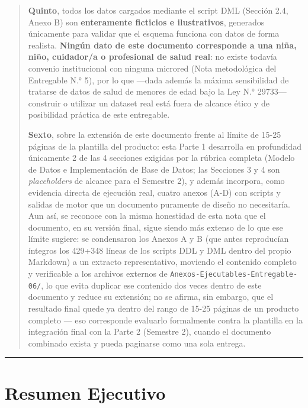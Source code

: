 \documentclass[11pt,a4paper]{article}
\begin{document}
\begin{quote}
\textbf{Quinto}, todos los datos cargados mediante el script DML (Sección 2.4, Anexo B) son \textbf{enteramente ficticios e ilustrativos}, generados únicamente para validar que el esquema funciona con datos de forma realista. \textbf{Ningún dato de este documento corresponde a una niña, niño, cuidador/a o profesional de salud real}: no existe todavía convenio institucional con ninguna microred (Nota metodológica del Entregable N.° 5), por lo que ---dada además la máxima sensibilidad de tratarse de datos de salud de menores de edad bajo la Ley N.° 29733--- construir o utilizar un dataset real está fuera de alcance ético y de posibilidad práctica de este entregable.

\textbf{Sexto}, sobre la extensión de este documento frente al límite de 15-25 páginas de la plantilla del producto: esta Parte 1 desarrolla en profundidad únicamente 2 de las 4 secciones exigidas por la rúbrica completa (Modelo de Datos e Implementación de Base de Datos; las Secciones 3 y 4 son \emph{placeholders} de alcance para el Semestre 2), y además incorpora, como evidencia directa de ejecución real, cuatro anexos (A-D) con scripts y salidas de motor que un documento puramente de diseño no necesitaría. Aun así, se reconoce con la misma honestidad de esta nota que el documento, en su versión final, sigue siendo más extenso de lo que ese límite sugiere: se condensaron los Anexos A y B (que antes reproducían íntegros los 429+348 líneas de los scripts DDL y DML dentro del propio Markdown) a un extracto representativo, moviendo el contenido completo y verificable a los archivos externos de \texttt{Anexos-Ejecutables-Entregable-06/}, lo que evita duplicar ese contenido dos veces dentro de este documento y reduce su extensión; no se afirma, sin embargo, que el resultado final quede ya dentro del rango de 15-25 páginas de un producto completo --- eso corresponde evaluarlo formalmente contra la plantilla en la integración final con la Parte 2 (Semestre 2), cuando el documento combinado exista y pueda paginarse como una sola entrega.
\end{quote}

\begin{center}\rule{0.5\linewidth}{0.5pt}\end{center}

\section{Resumen Ejecutivo}\label{resumen-ejecutivo}
\end{document}
